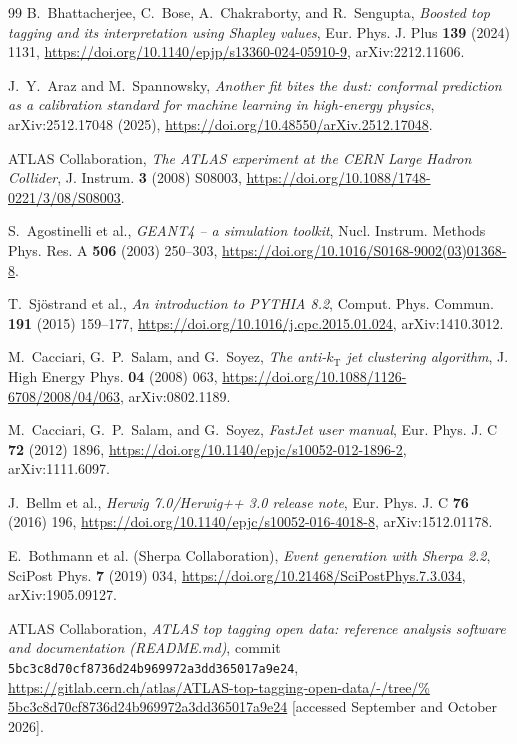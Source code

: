 \documentclass[pdflatex,sn-mathphys,Numbered,iicol]{sn-jnl}
\begin{document}
\begin{thebibliography}{99}
B.~Bhattacherjee, C.~Bose, A.~Chakraborty, and R.~Sengupta,
\emph{Boosted top tagging and its interpretation using Shapley values},
Eur. Phys. J. Plus \textbf{139} (2024) 1131,
\url{https://doi.org/10.1140/epjp/s13360-024-05910-9},
arXiv:2212.11606.

J.~Y.~Araz and M.~Spannowsky,
\emph{Another fit bites the dust: conformal prediction as a calibration standard for
machine learning in high-energy physics},
arXiv:2512.17048 (2025),
\url{https://doi.org/10.48550/arXiv.2512.17048}.

ATLAS Collaboration,
\emph{The ATLAS experiment at the CERN Large Hadron Collider},
J. Instrum. \textbf{3} (2008) S08003,
\url{https://doi.org/10.1088/1748-0221/3/08/S08003}.

S.~Agostinelli et al.,
\emph{GEANT4 -- a simulation toolkit},
Nucl. Instrum. Methods Phys. Res. A \textbf{506} (2003) 250--303,
\url{https://doi.org/10.1016/S0168-9002(03)01368-8}.

T.~Sj\"{o}strand et al.,
\emph{An introduction to PYTHIA 8.2},
Comput. Phys. Commun. \textbf{191} (2015) 159--177,
\url{https://doi.org/10.1016/j.cpc.2015.01.024},
arXiv:1410.3012.

M.~Cacciari, G.~P.~Salam, and G.~Soyez,
\emph{The anti-$k_\mathrm{T}$ jet clustering algorithm},
J. High Energy Phys. \textbf{04} (2008) 063,
\url{https://doi.org/10.1088/1126-6708/2008/04/063},
arXiv:0802.1189.

M.~Cacciari, G.~P.~Salam, and G.~Soyez,
\emph{FastJet user manual},
Eur. Phys. J. C \textbf{72} (2012) 1896,
\url{https://doi.org/10.1140/epjc/s10052-012-1896-2},
arXiv:1111.6097.

J.~Bellm et al.,
\emph{Herwig 7.0/Herwig++ 3.0 release note},
Eur. Phys. J. C \textbf{76} (2016) 196,
\url{https://doi.org/10.1140/epjc/s10052-016-4018-8},
arXiv:1512.01178.

E.~Bothmann et al. (Sherpa Collaboration),
\emph{Event generation with Sherpa 2.2},
SciPost Phys. \textbf{7} (2019) 034,
\url{https://doi.org/10.21468/SciPostPhys.7.3.034},
arXiv:1905.09127.

ATLAS Collaboration,
\emph{ATLAS top tagging open data: reference analysis software and documentation (README.md)},
commit \texttt{5bc3c8d70cf8736d24b\linebreak[0]969972a3dd365017a9e24},
\url{https://gitlab.cern.ch/atlas/ATLAS-top-tagging-open-data/-/tree/%
5bc3c8d70cf8736d24b969972a3dd365017a9e24}
[accessed September and October 2026].


\end{thebibliography}
\end{document}
